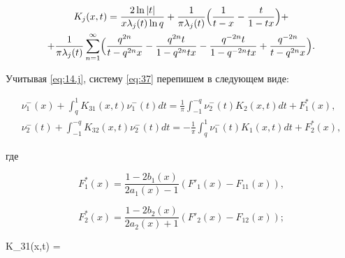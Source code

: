 \begin{multline}

{K_j}(x,t) = \frac{{2\ln |t|}}{{x{\lambda _j}(t)\ln q}} + \frac{1}{{\pi {\lambda _j}(t)}}

\Bigl( {\frac{1}{{t - x}} - \frac{t}{{1 - tx}}} \Bigr) + 

\\

 + \frac{1}{{\pi {\lambda _j}(t)}}\sum\limits_{n = 1}^\infty  

 \Bigl( {\frac{{{q^{2n}}}}{{t - {q^{2n}}x}} - \frac{{{q^{2n}}t}}{{1 - {q^{2n}}tx}} - \frac{{{q^{ - 2n}}t}}{{1 - {q^{ - 2n}}tx}} + \frac{{{q^{ - 2n}}}}{{t - {q^{2n}}x}}} \Bigr). \label{eq:38}

\end{multline}

Учитывая \eqref{eq:14.j}, систему \eqref{eq:37} перепишем в следующем виде:

\begin{equation}

\begin{array}{l}

\displaystyle

\nu _1^ - (x) +  \int _q^1 {{K_{31}}(x,t)\nu _1^ - (t)dt}  = \frac{1}{\pi } \int _{ - 1}^{ - q} {\nu _2^ - (t){K_2}(x,t)dt}  + F_1^ * (x),\\

\displaystyle

\nu _2^ - (t) +  \int _{ - 1}^{ - q} {{K_{32}}(x,t)\nu _2^ - (t)dt}  =  - \frac{1}{\pi } \int _q^1 {\nu _1^ - (t){K_1}(x,t)dt}  + F_2^*(x),

\end{array} 

\label{eq:39}

\end{equation}

где  

$$F_1^ * (x) = \frac{{1 - 2{b_1}(x)}}{{2{a_1}(x) - 1}}\left( {{F'_1}(x) - {F_{11}}(x)} \right),$$  

$$F_2^ * (x) = \frac{{1 - 2{b_2}(x)}}{{2{a_2}(x) + 1}}\left( {{F'_2}(x) - {F_{12}}(x)} \right);$$

$${K_{31}}(x,t) = 

